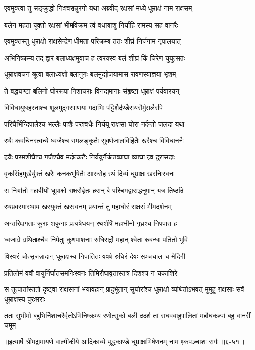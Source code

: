 \twolineshloka
{एवमुक्त्वा तु सङ्क्रुद्धो निःश्वसन्नुरगो यथा}
{अब्रवीद् रक्षसां मध्ये धूम्राक्षं नाम राक्षसम्} %

\twolineshloka
{बलेन महता युक्तो रक्षसां भीमविक्रम}
{त्वं वधायाशु निर्याहि रामस्य सह वानरैः} %

\twolineshloka
{एवमुक्तस्तु धूम्राक्षो राक्षसेन्द्रेण धीमता}
{परिक्रम्य ततः शीघ्रं निर्जगाम नृपालयात्} %

\twolineshloka
{अभिनिष्क्रम्य तद् द्वारं बलाध्यक्षमुवाच ह}
{त्वरयस्व बलं शीघ्रं किं चिरेण युयुत्सतः} %

\twolineshloka
{धूम्राक्षवचनं श्रुत्वा बलाध्यक्षो बलानुगः}
{बलमुद्योजयामास रावणस्याज्ञया भृशम्} %

\twolineshloka
{ते बद्धघण्टा बलिनो घोररूपा निशाचराः}
{विनद्यमानाः संहृष्टा धूम्राक्षं पर्यवारयन्} %

\twolineshloka
{विविधायुधहस्ताश्च शूलमुद्गरपाणयः}
{गदाभिः पट्टिशैर्दण्डैरायसैर्मुसलैरपि} %

\twolineshloka
{परिघैर्भिन्दिपालैश्च भल्लैः पाशैः परश्वधैः}
{निर्ययू राक्षसा घोरा नर्दन्तो जलदा यथा} %

\twolineshloka
{रथैः कवचिनस्त्वन्ये ध्वजैश्च समलङ्कृतैः}
{सुवर्णजालविहितैः खरैश्च विविधाननैः} %

\twolineshloka
{हयैः परमशीघ्रैश्च गजैश्चैव मदोत्कटैः}
{निर्ययुर्नैर्ऋतव्याघ्रा व्याघ्रा इव दुरासदाः} %

\twolineshloka
{वृकसिंहमुखैर्युक्तं खरैः कनकभूषितैः}
{आरुरोह रथं दिव्यं धूम्राक्षः खरनिःस्वनः} %

\twolineshloka
{स निर्यातो महावीर्यो धूम्राक्षो राक्षसैर्वृतः}
{हसन् वै पश्चिमद्वाराद्धनूमान् यत्र तिष्ठति} %

\twolineshloka
{रथप्रवरमास्थाय खरयुक्तं खरस्वनम्}
{प्रयान्तं तु महाघोरं राक्षसं भीमदर्शनम्} %

\twolineshloka
{अन्तरिक्षगताः क्रूराः शकुनाः प्रत्यषेधयन्}
{रथशीर्षे महाभीमो गृध्रश्च निपपात ह} %

\twolineshloka
{ध्वजाग्रे ग्रथिताश्चैव निपेतुः कुणपाशनाः}
{रुधिरार्द्रो महान् श्वेतः कबन्धः पतितो भुवि} %

\twolineshloka
{विस्वरं चोत्सृजन्नादान् धूम्राक्षस्य निपातितः}
{ववर्ष रुधिरं देवः सञ्चचाल च मेदिनी} %

\twolineshloka
{प्रतिलोमं ववौ वायुर्निर्घातसमनिःस्वनः}
{तिमिरौघावृतास्तत्र दिशश्च न चकाशिरे} %

\threelineshloka
{स तूत्पातांस्ततो दृष्ट्वा राक्षसानां भयावहान्}
{प्रादुर्भूतान् सुघोरांश्च धूम्राक्षो व्यथितोऽभवत्}
{मुमुहू राक्षसाः सर्वे धूम्राक्षस्य पुरःसराः} %

\twolineshloka
{ततः सुभीमो बहुभिर्निशाचरैर्वृतोऽभिनिष्क्रम्य रणोत्सुको बली}
{ददर्श तां राघवबाहुपालितां महौघकल्पां बहु वानरीं चमूम्} %


॥इत्यार्षे श्रीमद्रामायणे वाल्मीकीये आदिकाव्ये युद्धकाण्डे धूम्राक्षाभिषेणनम् नाम एकपञ्चाशः सर्गः ॥६-५१॥
